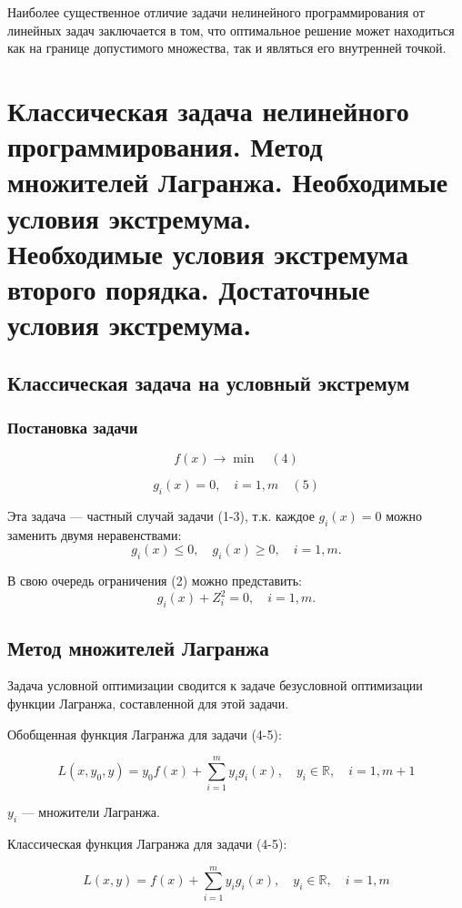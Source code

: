 \documentclass[17pt]{extarticle}
\begin{document}
Наиболее существенное отличие задачи
нелинейного программирования от линейных задач
заключается в том, что оптимальное решение может
находиться как на границе допустимого множества,
так и являться его внутренней точкой.




\section{Классическая задача нелинейного программирования. Метод множителей Лагранжа.
  Необходимые условия экстремума. \\ Необходимые условия экстремума второго порядка.
  Достаточные условия экстремума.}

\subsection*{Классическая задача на условный экстремум}

\subsubsection*{Постановка задачи}

\[
    f(x) \rightarrow \min \quad (4)
\]

\[
    g_i(x) = 0, \quad i = 1, m \quad (5)
\]

Эта задача — частный случай задачи (1-3), т.к. каждое \( g_i(x) = 0 \) можно заменить двумя неравенствами:
\[
    g_i(x) \leq 0, \quad g_i(x) \geq 0, \quad i = 1, m.
\]

В свою очередь ограничения (2) можно представить:
\[
    g_i(x) + Z_i^2 = 0, \quad i = 1, m.
\]

\subsection*{Метод множителей Лагранжа}

Задача условной оптимизации сводится к задаче безусловной оптимизации функции Лагранжа, составленной для этой задачи.

Обобщенная функция Лагранжа для задачи (4-5):

\[
    L(x, y_0, y) = y_0 f(x) + \sum_{i=1}^m y_i g_i(x), \quad y_i \in \mathbb{R}, \quad i = 1, m + 1
\]

\( y_i \) — множители Лагранжа.

Классическая функция Лагранжа для задачи (4-5):

\[
    L(x, y) = f(x) + \sum_{i=1}^m y_i g_i(x), \quad y_i \in \mathbb{R}, \quad i = 1, m
\]
\end{document}
